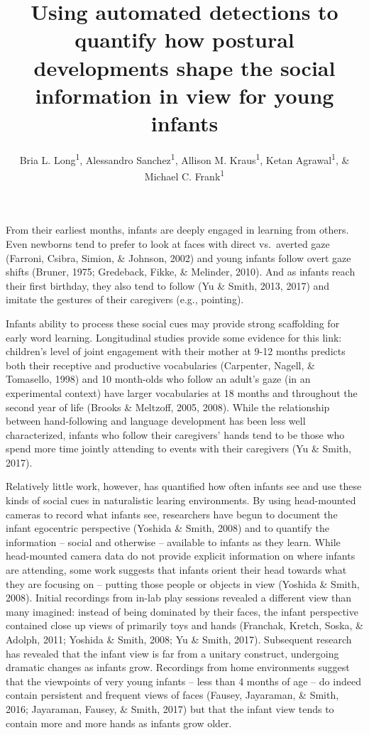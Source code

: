 \documentclass[english,man]{apa6}
\author{Bria L. Long\textsuperscript{1}, Alessandro Sanchez\textsuperscript{1}, Allison M. Kraus\textsuperscript{1}, Ketan Agrawal\textsuperscript{1}, \& Michael C. Frank\textsuperscript{1}}
\affiliation{
\vspace{0.5cm}
\textsuperscript{1} Department of Psychology, Stanford University}
\title{Using automated detections to quantify how postural developments shape
the social information in view for young infants}
\date{}
\begin{document}
\maketitle

From their earliest months, infants are deeply engaged in learning from
others. Even newborns tend to prefer to look at faces with direct
vs.~averted gaze (Farroni, Csibra, Simion, \& Johnson, 2002) and young
infants follow overt gaze shifts (Bruner, 1975; Gredeback, Fikke, \&
Melinder, 2010). And as infants reach their first birthday, they also
tend to follow (Yu \& Smith, 2013, 2017) and imitate the gestures of
their caregivers (e.g., pointing).

Infants ability to process these social cues may provide strong
scaffolding for early word learning. Longitudinal studies provide some
evidence for this link: children's level of joint engagement with their
mother at 9-12 months predicts both their receptive and productive
vocabularies (Carpenter, Nagell, \& Tomasello, 1998) and 10 month-olds
who follow an adult's gaze (in an experimental context) have larger
vocabularies at 18 months and throughout the second year of life (Brooks
\& Meltzoff, 2005, 2008). While the relationship between hand-following
and language development has been less well characterized, infants who
follow their caregivers' hands tend to be those who spend more time
jointly attending to events with their caregivers (Yu \& Smith, 2017).

Relatively little work, however, has quantified how often infants see
and use these kinds of social cues in naturalistic learing environments.
By using head-mounted cameras to record what infants see, researchers
have begun to document the infant egocentric perspective (Yoshida \&
Smith, 2008) and to quantify the information -- social and otherwise --
available to infants as they learn. While head-mounted camera data do
not provide explicit information on where infants are attending, some
work suggests that infants orient their head towards what they are
focusing on -- putting those people or objects in view (Yoshida \&
Smith, 2008). Initial recordings from in-lab play sessions revealed a
different view than many imagined: instead of being dominated by their
faces, the infant perspective contained close up views of primarily toys
and hands (Franchak, Kretch, Soska, \& Adolph, 2011; Yoshida \& Smith,
2008; Yu \& Smith, 2017). Subsequent research has revealed that the
infant view is far from a unitary construct, undergoing dramatic changes
as infants grow. Recordings from home environments suggest that the
viewpoints of very young infants -- less than 4 months of age -- do
indeed contain persistent and frequent views of faces (Fausey,
Jayaraman, \& Smith, 2016; Jayaraman, Fausey, \& Smith, 2017) but that
the infant view tends to contain more and more hands as infants grow
older.
\end{document}
